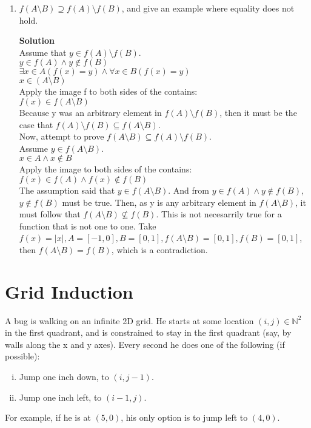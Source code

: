\documentclass[11pt]{article}
\newcommand*{\Question}[1]{\vfill\pagebreak[3]\section{#1}}
\newcommand*{\N}{\mathbb{N}}
\begin{document}
\begin{enumerate}
\pagebreak
\item $f(A \setminus B) \supseteq f(A) \setminus f(B)$, and give an example where equality does not hold.
\begin{mdframed} \textbf{Solution} \\
Assume that $y \in f(A) \setminus f(B)$. \\
$y \in f(A) \land y \notin f(B)$ \\
$\exists x \in A(f(x)=y) \land \forall x \in B(f(x)=y)$ \\
$x \in (A \setminus B)$ \\
Apply the image f to both sides of the contains: \\
$f(x) \in f(A \setminus B)$ \\
Because y was an arbitrary element in $f(A) \setminus f(B)$, then it must be the case that $f(A) \setminus f(B) \subseteq f(A \setminus B)$. \\
Now, attempt to prove $f(A \setminus B) \subseteq f(A) \setminus f(B)$. \\
Assume $y \in f(A \setminus B)$. \\
$x \in A \land x \notin B$ \\
Apply the image to both sides of the contains: \\
$f(x) \in f(A) \land f(x) \notin f(B)$ \\
The assumption said that $y \in f(A \setminus B)$. And from $y \in f(A) \land y \notin f(B)$, $y \notin f(B)$ must be true. Then, as y is any arbitrary element in $f(A \setminus B)$, it must follow that $f(A \setminus B) \not\subseteq f(B)$. This is not necesarrily true for a function that is not one to one. Take $f(x) = \mid x \mid, A=[-1,0], B=[0,1], f(A\setminus B) = [0,1], f(B) = [0,1]$, then $f(A \setminus B) = f(B)$, which is a contradiction.

\end{mdframed}

\end{enumerate}



\Question{Grid Induction}

A bug is walking on an infinite 2D grid.
He starts at some location $(i, j) \in \N^2$ in the first quadrant,
and is constrained to stay in the first quadrant (say, by walls along the x and
y axes).
Every second he does one of the following (if possible):
\begin{enumerate}[(i)]
  \item Jump one inch down, to $(i, j-1)$.
  \item Jump one inch left, to $(i-1, j)$.
\end{enumerate}
For example, if he is at $(5, 0)$, his only option is to jump left to $(4, 0)$.
\end{document}
